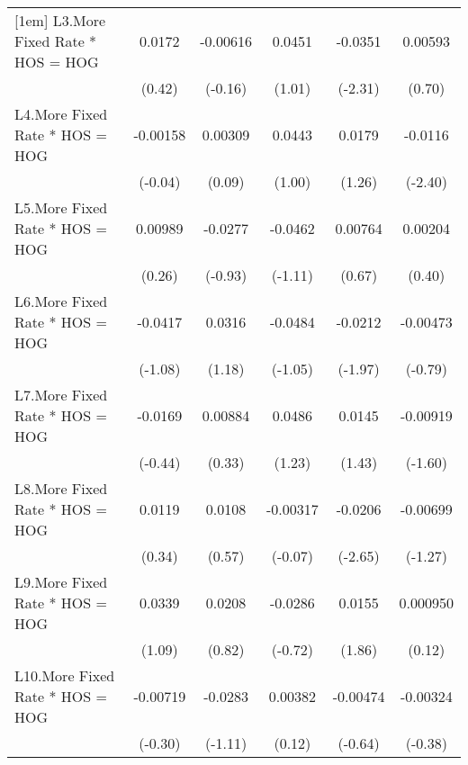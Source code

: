 {\begin{tabular}{l*{5}{c}}
[1em]
L3.More Fixed Rate * HOS = HOG&   0.0172         & -0.00616         &   0.0451         &  -0.0351\sym{*}  &  0.00593         \\
                &   (0.42)         &  (-0.16)         &   (1.01)         &  (-2.31)         &   (0.70)         \\
[1em]
L4.More Fixed Rate * HOS = HOG& -0.00158         &  0.00309         &   0.0443         &   0.0179         &  -0.0116\sym{*}  \\
                &  (-0.04)         &   (0.09)         &   (1.00)         &   (1.26)         &  (-2.40)         \\
[1em]
L5.More Fixed Rate * HOS = HOG&  0.00989         &  -0.0277         &  -0.0462         &  0.00764         &  0.00204         \\
                &   (0.26)         &  (-0.93)         &  (-1.11)         &   (0.67)         &   (0.40)         \\
[1em]
L6.More Fixed Rate * HOS = HOG&  -0.0417         &   0.0316         &  -0.0484         &  -0.0212         & -0.00473         \\
                &  (-1.08)         &   (1.18)         &  (-1.05)         &  (-1.97)         &  (-0.79)         \\
[1em]
L7.More Fixed Rate * HOS = HOG&  -0.0169         &  0.00884         &   0.0486         &   0.0145         & -0.00919         \\
                &  (-0.44)         &   (0.33)         &   (1.23)         &   (1.43)         &  (-1.60)         \\
[1em]
L8.More Fixed Rate * HOS = HOG&   0.0119         &   0.0108         & -0.00317         &  -0.0206\sym{**} & -0.00699         \\
                &   (0.34)         &   (0.57)         &  (-0.07)         &  (-2.65)         &  (-1.27)         \\
[1em]
L9.More Fixed Rate * HOS = HOG&   0.0339         &   0.0208         &  -0.0286         &   0.0155         & 0.000950         \\
                &   (1.09)         &   (0.82)         &  (-0.72)         &   (1.86)         &   (0.12)         \\
[1em]
L10.More Fixed Rate * HOS = HOG& -0.00719         &  -0.0283         &  0.00382         & -0.00474         & -0.00324         \\
                &  (-0.30)         &  (-1.11)         &   (0.12)         &  (-0.64)         &  (-0.38)         \\

\end{tabular}}
